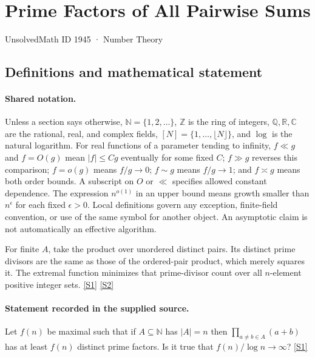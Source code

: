 \documentclass[11pt,a4paper]{article}
\newcommand{\N}{\mathbb{N}}
\newcommand{\Z}{\mathbb{Z}}
\newcommand{\Q}{\mathbb{Q}}
\newcommand{\R}{\mathbb{R}}
\newcommand{\C}{\mathbb{C}}
\newcommand{\sref}[2]{\hyperlink{source:#1:#2}{[S#2]}}
\begin{document}

\setcounter{section}{1944}

\section{Prime Factors of All Pairwise Sums}\label{1945}

{\small\sffamily UnsolvedMath ID 1945 · Number Theory}

\subsection{Definitions and mathematical statement}

\paragraph{Shared notation.}Unless a section says otherwise, $\N=\{1,2,\ldots\}$,
$\Z$ is the ring of integers, $\Q,\R,\C$ are the rational, real, and complex
fields, $[N]=\{1,\ldots,\lfloor N\rfloor\}$, and $\log$ is the natural
logarithm. For real functions of a parameter tending to infinity,
$f\ll g$ and $f=O(g)$ mean $|f|\leq Cg$ eventually for some fixed $C$;
$f\gg g$ reverses this comparison; $f=o(g)$ means $f/g\to0$;
$f\sim g$ means $f/g\to1$; and $f\asymp g$ means both order bounds.
A subscript on $O$ or $\ll$ specifies allowed constant dependence.
The expression $n^{o(1)}$ in an upper bound means growth smaller than
$n^\epsilon$ for each fixed $\epsilon>0$. Local definitions govern any
exception, finite-field convention, or use of the same symbol for another
object. An asymptotic claim is not automatically an effective algorithm.



For finite $A$, take the product over unordered distinct pairs. Its distinct prime divisors are the same as those of the ordered-pair product, which merely squares it. The extremal function minimizes that prime-divisor count over all $n$-element positive integer sets. \sref{1945}{1} \sref{1945}{2}

\paragraph{Statement recorded in the supplied source.}
Let $f(n)$ be maximal such that if $A\subseteq\mathbb{N}$ has $\lvert A\rvert=n$ then $\prod_{a\neq b\in A}(a+b)$ has at least $f(n)$ distinct prime factors. Is it true that $f(n)/\log n\to\infty$? \sref{1945}{1}
\end{document}
